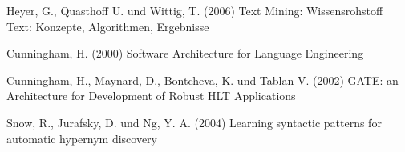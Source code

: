 \begin{thebibliography}{99}

Heyer, G., Quasthoff U. und Wittig, T. (2006)
\newblock Text Mining: Wissensrohstoff Text: Konzepte, Algorithmen,
Ergebnisse

Cunningham, H. (2000)
\newblock Software Architecture for Language Engineering

Cunningham, H., Maynard, D., Bontcheva, K. und Tablan V. (2002)
\newblock GATE: an Architecture for Development of Robust HLT
Applications

Snow, R., Jurafsky, D. und Ng, Y. A. (2004)
\newblock Learning syntactic patterns for automatic hypernym discovery

\end{thebibliography}